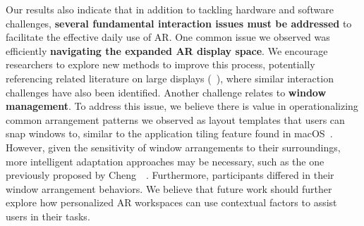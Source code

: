 Our results also indicate that in addition to tackling hardware and software challenges, \textbf{several fundamental interaction issues must be addressed} to facilitate the effective daily use of AR. 
One common issue we observed was efficiently \textbf{navigating the expanded AR display space}.
We encourage researchers to explore new methods to improve this process, potentially referencing related literature on large displays (\eg~\cite{czerwinski2006largedisplay}), where similar interaction challenges have also been identified.
Another challenge relates to \textbf{window management}. 
To address this issue, we believe there is value in operationalizing common arrangement patterns we observed as layout templates that users can snap windows to, similar to the application tiling feature found in macOS~\cite{macOStiling}.
However, given the sensitivity of window arrangements to their surroundings, more intelligent adaptation approaches may be necessary, such as the one previously proposed by Cheng~\etal~\cite{cheng2021semanticadapt}.
Furthermore, participants differed in their window arrangement behaviors.
We believe that future work should further explore how personalized AR workspaces can use contextual factors to assist users in their tasks.

